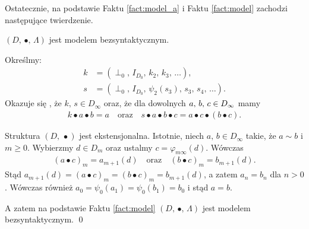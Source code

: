 Ostatecznie, na podstawie Faktu \ref{fact:model_a} i Faktu \ref{fact:model} zachodzi następujące twierdzenie.

\begin{twierdzenie}
  \((D,\,\bullet,\,\Lambda)\) jest modelem bezsyntaktycznym.
\end{twierdzenie}
\begin{dowod}
Określmy:
\begin{align*}
  k &=(\perp_0,\,I_{D_0},\,k_2,\,k_3,\,\dots),\\
  s &=(\perp_0,\,I_{D_0},\,\psi_2(s_3),\,s_3,\,s_4,\,\dots).
\end{align*}
Okazuje się \cite[Tw. 16.51, 16.53]{Hindley:2008:LCI:1388400}, że \(k,\,s\in D_\infty\) oraz, że dla dowolnych \(a,\,b,\,c\in\nobreak D_\infty\) mamy
\begin{align*}
  k\bullet a \bullet b = a\quad \text{oraz}\quad s\bullet a\bullet b\bullet c = a\bullet c\bullet (b\bullet c).
\end{align*}

Struktura \((D,\,\bullet)\) jest ekstensjonalna. Istotnie, niech \(a,\,b\in D_\infty\) takie, że \(a\sim b\) i \(m\geq 0\). Wybierzmy \(d\in D_m\) oraz ustalmy \(c=\varphi_{m\infty}(d)\). Wówczas \cite[Tw. 16.54]{Hindley:2008:LCI:1388400}
\begin{align*}
  (a\bullet c)_m = a_{m+1}(d)\quad\text{oraz}\quad (b\bullet c)_m = b_{m+1}(d).
\end{align*}
Stąd \(a_{m+1}(d)=(a\bullet c)_m = (b\bullet c)_m = b_{m+1}(d)\), a zatem \(a_n = b_n\) dla \(n>0\). Wówczas również \(a_0=\psi_0(a_1)=\psi_0(b_1)=b_0\) i stąd \(a=b\).

  A zatem na podstawie Faktu \ref{fact:model} \((D,\,\bullet,\,\Lambda)\) jest modelem bezsyntaktycznym. \qed
\end{dowod}
